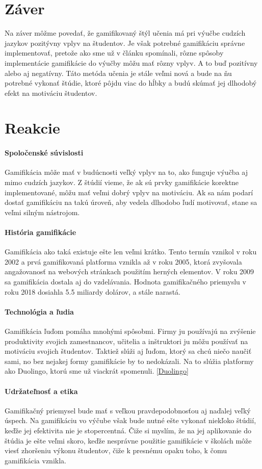 \documentclass[10pt,oneside,slovak,a4paper]{article}
\begin{document}
\label{tools}
\section{Záver} \label{zaver}
Na záver môžme povedať, že gamifikovaný štýl učenia má pri výučbe cudzích jazykov pozitývny vplyv na študentov. Je však potrebné gamifikáciu správne implementovať, pretože ako sme už v článku spomínali, rôzne spôsoby implementácie gamifikácie do výučby môžu mať rôzny vplyv. A to buď pozitívny alebo aj negatívny. Táto metóda učenia je stále veľmi nová a bude na ňu potrebné vykonať štúdie, ktoré pôjdu viac do hĺbky a budú skúmať jej dlhodobý efekt na motiváciu študentov. 


\section{Reakcie} \label {reakcie}
\paragraph{Spoločenské súvislosti} Gamifikácia môže mať v budúcnosti veľký vplyv na to, ako funguje výučba aj mimo cudzích jazykov. Z štúdií vieme, že ak sú prvky gamifikácie korektne implementované, môžu mať veľmi dobrý vplyv na motiváciu. Ak sa nám podarí dostať gamifikáciu na takú úroveň, aby vedela dlhodobo ľudí motivovať, stane sa veľmi silným nástrojom. 

\paragraph{História gamifikácie} Gamifikácia ako taká existuje ešte len veľmi krátko. Tento termín vznikol v roku 2002 a prvá gamifikovaná platforma vznikla až v roku 2005, ktorá zvyšovala angažovanosť na webových stránkach použitím herných elementov. V roku 2009 sa gamifikácia dostala aj do vzdelávania. Hodnota gamifikačného priemyslu v roku 2018 dosiahla 5.5 miliardy dolárov, a stále narastá.
\paragraph{Technológia a ľudia} Gamifikácia ľuďom pomáha mnohými spôsobmi. Firmy ju používajú na zvýšenie produktivity svojich zamestnancov, učitelia a inštruktori ju môžu používať na motiváciu svojich študentov. Taktiež slúži aj ľuďom, ktorý sa chcú niečo naučiť sami, no bez nejakej formy gamifikácie by to nedokázali. Na to slúžia platformy ako Duolingo, ktorú sme už viackrát spomenuli. \ref{Duolingo}
\paragraph{Udržateľnosť a etika} Gamifikačný priemysel bude mať s veľkou pravdepodobnosťou aj naďalej veľký úspech. Na gamifikáciu vo výčube však bude nutné ešte vykonať niekľoko štúdií, keďže jej efektivita nie je stopercentná. Čiže si myslím, že na jej aplikovanie do štúdia je ešte veľmi skoro, keďže nesprávne použitie gamifikácie v školách môže viesť zhoršeniu výkonu študentov, čiže k presnému opaku toho, k čomu gamifikácia vznikla.


\end{document}

